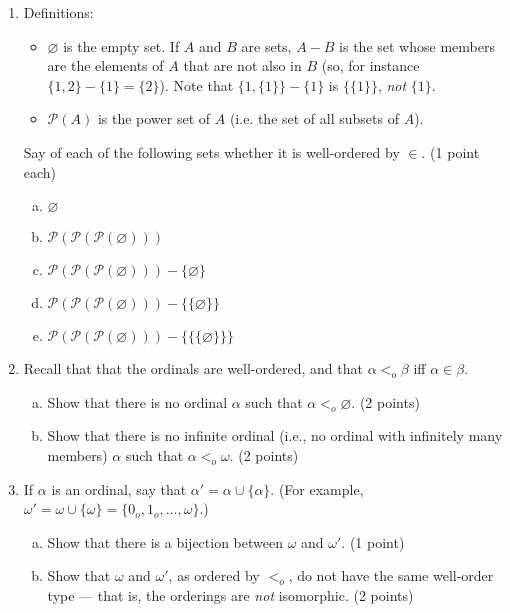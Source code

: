 \documentclass[12pt,a4paper]{article}
\begin{document}
\begin{enumerate}

\item Definitions: 
\begin{itemize}
\item $\varnothing$ is the empty set. If $A$ and $B$ are sets, $A-B$ is the set whose members are the elements of $A$ that are not also in $B$ (so, for instance $\{1, 2\} - \{1\} = \{2\}$). Note that $\{1, \{1\}\} - \{1\}$ is $\{\{1\}\}$, \emph{not} $\{1\}$.
\item $\mathcal{P}(A)$ is the power set of $A$ (i.e. the set of all subsets of $A$).
\end{itemize}

Say of each of the following sets whether it is well-ordered by $\in$. (1 point each)
\begin{enumerate}[(a)]
\item $\varnothing$
\item $\mathcal{P}(\mathcal{P}(\mathcal{P}(\varnothing)))$
\item $\mathcal{P}(\mathcal{P}(\mathcal{P}(\varnothing))) - \{\varnothing\}$
\item $\mathcal{P}(\mathcal{P}(\mathcal{P}(\varnothing))) - \{\{\varnothing\}\}$
\item $\mathcal{P}(\mathcal{P}(\mathcal{P}(\varnothing))) - \{\{\{\varnothing\}\}\}$
\end{enumerate}

\item Recall that that the ordinals are well-ordered, and that $\alpha<_o\beta$ iff $\alpha\in\beta$.
\begin{enumerate}[(a)]
\item Show that there is no ordinal $\alpha$ such that $\alpha<_o\varnothing$. (2 points)
\item Show that there is no infinite ordinal (i.e., no ordinal with infinitely many members) $\alpha$ such that $\alpha<_o\omega$. (2 points)
\end{enumerate}

\item  If $\alpha$ is an ordinal, say that $\alpha'=\alpha \cup \{\alpha\}$. (For example, $\omega' = \omega \cup \{\omega\} = \{0_o, 1_o,\ldots,\omega\}$.)
\begin{enumerate}[(a)]
\item Show that there is a bijection between $\omega$ and $\omega'$. (1 point)
\item Show that $\omega$ and $\omega'$, as ordered by $<_o$, do not have the same well-order type --- that is, the orderings are \emph{not} isomorphic. (2 points)
\end{enumerate}


\end{enumerate}
\end{document}
